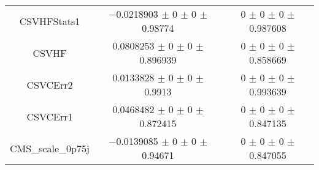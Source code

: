 \begin{table}
\begin{tabular}{ccc}
CSVHFStats1 	& \num{-0.0218903} $\pm$ \num{0} $\pm$ \num{0} $\pm$ \num{0.98774} 	& \num{0} $\pm$ \num{0} $\pm$ \num{0} $\pm$ \num{0.987608}\\
CSVHF 	& \num{0.0808253} $\pm$ \num{0} $\pm$ \num{0} $\pm$ \num{0.896939} 	& \num{0} $\pm$ \num{0} $\pm$ \num{0} $\pm$ \num{0.858669}\\
CSVCErr2 	& \num{0.0133828} $\pm$ \num{0} $\pm$ \num{0} $\pm$ \num{0.9913} 	& \num{0} $\pm$ \num{0} $\pm$ \num{0} $\pm$ \num{0.993639}\\
CSVCErr1 	& \num{0.0468482} $\pm$ \num{0} $\pm$ \num{0} $\pm$ \num{0.872415} 	& \num{0} $\pm$ \num{0} $\pm$ \num{0} $\pm$ \num{0.847135}\\
CMS\_scale\_0p75j 	& \num{-0.0139085} $\pm$ \num{0} $\pm$ \num{0} $\pm$ \num{0.94671} 	& \num{0} $\pm$ \num{0} $\pm$ \num{0} $\pm$ \num{0.847055}\\
\bottomrule
\end{tabular}
\end{table}